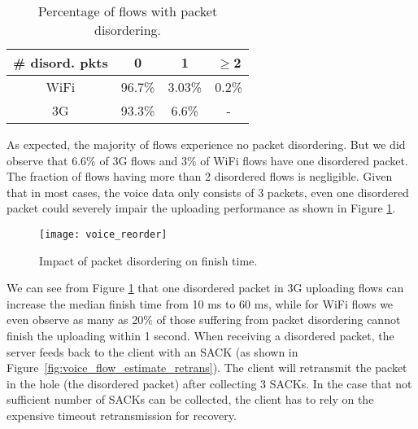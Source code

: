 
\begin{table}[th]
\caption{Percentage of flows with packet disordering.}
\label{tab:voice_reorder}
\centering
\renewcommand{\arraystretch}{1.0}
\begin{tabular}{c|c|c|c}
	\hline
	\# disord. pkts & 0 & 1 & $\ge$2 \\
	\hline
	WiFi & 96.7\% & 3.03\% & 0.2\% \\
	\hline
	3G & 93.3\% & 6.6\% & - \\
	\hline
\end{tabular}
\end{table}

As expected, the majority of flows experience no packet disordering. But we did observe that 6.6\% of 3G flows and 3\% of WiFi flows have one disordered packet. The fraction of flows having more than 2 disordered flows is negligible. Given that in most cases, the voice data only consists of 3 packets, even one disordered packet could severely impair the uploading performance as shown in Figure \ref{fig:voice_reorder}.


\begin{figure}[th]
\centering
	\texttt{[image: voice\_reorder]}
\caption{Impact of packet disordering on finish time.}
\label{fig:voice_reorder}
\end{figure}

We can see from Figure \ref{fig:voice_reorder} that one disordered packet in 3G uploading flows can increase the median finish time from 10 ms to 60 ms, while for WiFi flows we even observe as many as 20\% of those suffering from packet disordering cannot finish the uploading within 1 second. When receiving a disordered packet, the server feeds back to the client with an SACK (as shown in Figure~\ref{fig:voice_flow_estimate_retrans}). The client will retransmit the packet in the hole (\ie the disordered packet) after collecting 3 SACKs. In the case that not sufficient number of SACKs can be collected, the client has to rely on the expensive timeout retransmission for recovery. %

